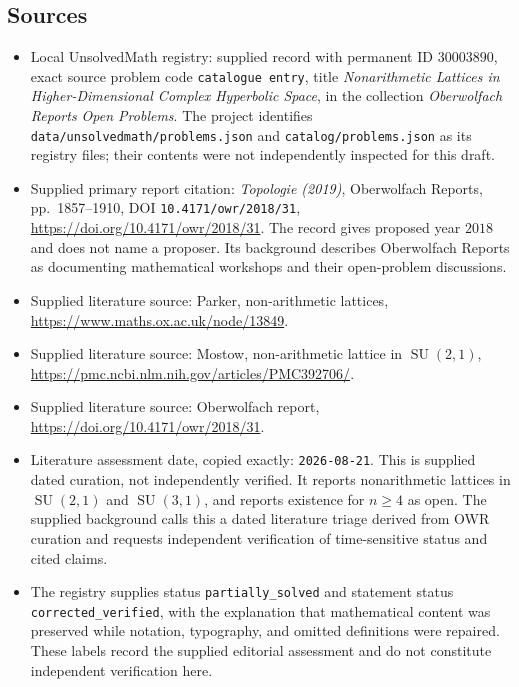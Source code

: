 \documentclass[11pt]{article}
\begin{document}
\subsection{Sources}
\begin{itemize}
\item Local UnsolvedMath registry: supplied record with permanent ID \(30003890\), exact source problem code \texttt{catalogue entry}, title \emph{Nonarithmetic Lattices in Higher-Dimensional Complex Hyperbolic Space}, in the collection \emph{Oberwolfach Reports Open Problems}. The project identifies \texttt{data/unsolvedmath/problems.json} and \texttt{catalog/problems.json} as its registry files; their contents were not independently inspected for this draft.
\item Supplied primary report citation: \emph{Topologie (2019)}, Oberwolfach Reports, pp.\ 1857--1910, DOI \texttt{10.4171/owr/2018/31}, \url{https://doi.org/10.4171/owr/2018/31}. The record gives proposed year \(2018\) and does not name a proposer. Its background describes Oberwolfach Reports as documenting mathematical workshops and their open-problem discussions.
\item Supplied literature source: Parker, non-arithmetic lattices, \url{https://www.maths.ox.ac.uk/node/13849}.
\item Supplied literature source: Mostow, non-arithmetic lattice in \(\operatorname{SU}(2,1)\), \url{https://pmc.ncbi.nlm.nih.gov/articles/PMC392706/}.
\item Supplied literature source: Oberwolfach report, \url{https://doi.org/10.4171/owr/2018/31}.
\item Literature assessment date, copied exactly: \texttt{2026-08-21}. This is supplied dated curation, not independently verified. It reports nonarithmetic lattices in \(\operatorname{SU}(2,1)\) and \(\operatorname{SU}(3,1)\), and reports existence for \(n\geq4\) as open. The supplied background calls this a dated literature triage derived from OWR curation and requests independent verification of time-sensitive status and cited claims.
\item The registry supplies status \texttt{partially\_solved} and statement status \texttt{corrected\_verified}, with the explanation that mathematical content was preserved while notation, typography, and omitted definitions were repaired. These labels record the supplied editorial assessment and do not constitute independent verification here.
\end{itemize}
\end{document}
